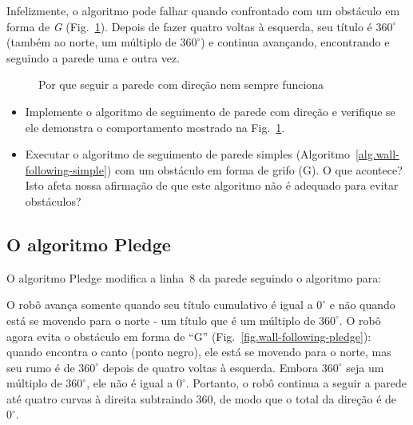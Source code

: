 Infelizmente, o algoritmo pode falhar quando confrontado com um obstáculo em forma de \emph{G} (Fig.~\ref{fig.wall-direction-bug}). Depois de fazer quatro voltas à esquerda, seu título é $360^\circ$ (também ao norte, um múltiplo de $360^\circ$) e continua avançando, encontrando e seguindo a parede uma e outra vez.

\begin{figure}
\begin{center}
\caption{Por que seguir a parede com direção nem sempre funciona}\label{fig.wall-direction-bug}
\end{center}
\end{figure}

\begin{framed}
\begin{itemize}
\item Implemente o algoritmo de seguimento de parede com direção e verifique se ele demonstra o comportamento mostrado na Fig.~\ref{fig.wall-direction-bug}.
\item Executar o algoritmo de seguimento de parede simples (Algoritmo~\ref{alg.wall-following-simple}) com um obstáculo em forma de grifo (G). O que acontece? Isto afeta nossa afirmação de que este algoritmo não é adequado para evitar obstáculos?
\end{itemize}
\end{framed}

\subsection{O algoritmo Pledge}

O algoritmo Pledge modifica a linha~8 da parede seguindo o algoritmo para:
\begin{quote}
\normalsize {}
\end{quote}
O robô avança somente quando seu título cumulativo é igual a $0^\circ$ e não quando está se movendo para o norte - um título que é um múltiplo de $360^\circ$. O robô agora evita o obstáculo em forma de ``G'' (Fig.~\ref{fig.wall-following-pledge}): quando encontra o canto (ponto negro), ele está se movendo para o norte, mas seu rumo é de $360^\circ$ depois de quatro voltas à esquerda. Embora $360^\circ$ seja um múltiplo de $360^\circ$, ele não é igual a $0^\circ$. Portanto, o robô continua a seguir a parede até quatro curvas à direita subtraindo $360$, de modo que o total da direção é de $0^\circ$.


